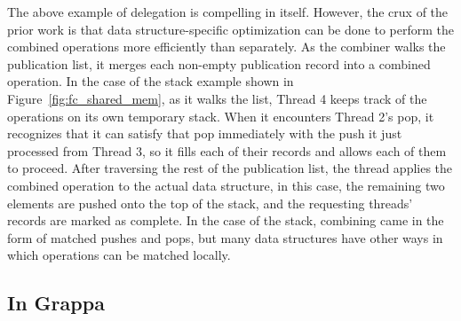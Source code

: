 The above example of delegation is compelling in itself. However, the crux of the prior work is that data structure-specific optimization can be done to perform the combined operations more efficiently than separately.
As the combiner walks the publication list, it merges each non-empty publication record into a combined operation. In the case of the stack example shown in Figure~\ref{fig:fc_shared_mem}, as it walks the list, Thread 4 keeps track of the operations on its own temporary stack. When it encounters Thread 2's pop, it recognizes that it can satisfy that pop immediately with the push it just processed from Thread 3, so it fills each of their records and allows each of them to proceed. After traversing the rest of the publication list, the thread applies the combined operation to the actual data structure, in this case, the remaining two elements are pushed onto the top of the stack, and the requesting threads' records are marked as complete.
In the case of the stack, combining came in the form of matched pushes and pops, but many data structures have other ways in which operations can be matched locally.

\subsection{In Grappa}

